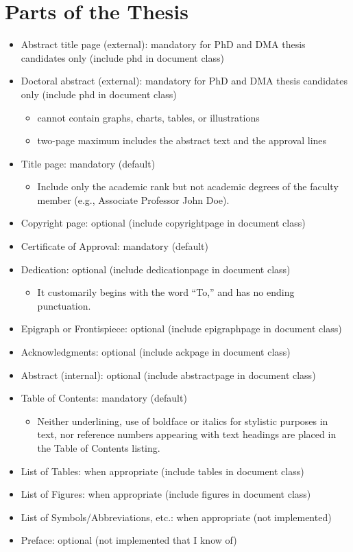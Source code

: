 \section{Parts of the Thesis}
\begin{itemize}
\item Abstract title page (external): mandatory for PhD and DMA thesis candidates
only (include phd in document class)
\item Doctoral abstract (external): mandatory for PhD and DMA thesis candidates
only (include phd in document class)

\begin{itemize}
\item cannot contain graphs, charts, tables, or illustrations
\item two-page maximum includes the abstract text and the approval lines
\end{itemize}
\item Title page: mandatory (default)

\begin{itemize}
\item Include only the academic rank \textendash{} but not academic degrees
\textendash{} of the faculty member (e.g., Associate Professor John
Doe).
\end{itemize}
\item Copyright page: optional (include copyrightpage in document class)
\item Certificate of Approval: mandatory (default)
\item Dedication: optional (include dedicationpage in document class)

\begin{itemize}
\item It customarily begins with the word \textquotedblleft{}To,\textquotedblright{}
and has no ending punctuation.
\end{itemize}
\item Epigraph or Frontispiece: optional (include epigraphpage in document
class)
\item Acknowledgments: optional (include ackpage in document class)
\item Abstract (internal): optional (include abstractpage in document class)
\item Table of Contents: mandatory (default)

\begin{itemize}
\item Neither underlining, use of boldface or italics for stylistic purposes
in text, nor reference numbers appearing with text headings are placed
in the Table of Contents listing.
\end{itemize}
\item List of Tables: when appropriate (include tables in document class)
\item List of Figures: when appropriate (include figures in document class)
\item List of Symbols/Abbreviations, etc.: when appropriate (not implemented)
\item Preface: optional (not implemented that I know of)
\end{itemize}

